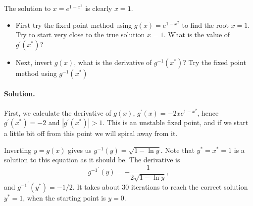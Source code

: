 \documentclass[graybox,sectrefs,envcountresetchap,open=right,final]{svmonodo}
\makeatletter
\newenvironment{doconceexercise}{}{}
\newcounter{doconceexercisecounter}%
\newcommand\listofexercises{
\chapter*{List of Exercises
          \@mkboth{List of Exercises}{List of Exercises}}
\markboth{List of Exercises}{List of Exercises}
\@starttoc{loe}
}
\makeatother
\begin{document}
\begin{doconceexercise}

                             

The solution to $x=e^{1-x^2}$ is clearly $x=1$.

\begin{itemize}
\item First try the fixed point method using $g(x)=e^{1-x^2}$ to find the root $x=1$. Try to start very close to the true solution $x=1$. What is the value of $g^\prime(x^*)$?

\item Next, invert $g(x)$, what is the derivative of $g^{-1}(x^*)$? Try the fixed point method using $g^{-1}(x^*)$
\end{itemize}

\noindent
\paragraph{Solution.}
First, we calculate the derivative of $g(x)$, $g^\prime(x)=-2xe^{1-x^2}$, hence $g^\prime(x^*)=-2$ and $|g^\prime(x^*)|>1$. This is an unstable fixed point, and if we start a little bit off from this point we will spiral away from it.

Inverting $y=g(x)$ gives us $ g^{-1} (y)=\sqrt{1-\ln y}$. Note that $y^*=x^*=1$ is a solution to this equation as it should be. The derivative is
\begin{equation}
{g^{-1}}^\prime(y)=-\frac{1}{2\sqrt{1-\ln y}},
\end{equation}
and $ {g^{-1}}^\prime(y^*)=-1/2 $.
It takes about 30 iterations to reach the correct solution $y^*=1$, when the starting point is $y=0$.


\end{doconceexercise}
\end{document}
